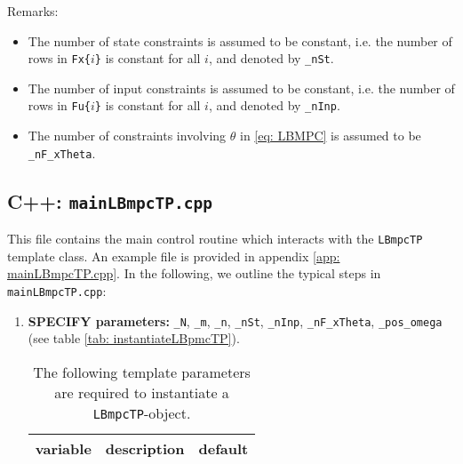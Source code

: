 \documentclass[letter]{article}
\begin{document}
\begin{sffamily}
\begin{table}[!htdp]
\begin{center}
\begin{tabular}{|l|l|l|}
\end{tabular}
\end{center}
\label{tab: parameters Init.m}
\end{table}

\noindent
Remarks:
\begin{itemize}
	\item The number of state constraints is assumed to be constant, i.e. the number of rows in \texttt{Fx\{$i$\}} is constant for all $i$, and  denoted by \texttt{\_nSt}.
	\item The number of input constraints is assumed to be constant, i.e. the number of rows in \texttt{Fu\{$i$\}} is constant for all $i$, and denoted by \texttt{\_nInp}.
	\item The number of constraints involving $\theta$ in \eqref{eq: LBMPC} is assumed to be \texttt{\_nF\_xTheta}.
\end{itemize}


\subsection{C++: \texttt{mainLBmpcTP.cpp}}
This file contains the main control routine which interacts with the \texttt{LBmpcTP} template class. An example file is provided in appendix \ref{app: mainLBmpcTP.cpp}. In the following, we outline the typical steps in \texttt{mainLBmpcTP.cpp}:

\begin{enumerate}
	\item \textbf{SPECIFY parameters:} \texttt{\_N}, \texttt{\_m}, \texttt{\_n}, \texttt{\_nSt}, \texttt{\_nInp}, \texttt{\_nF\_xTheta}, \texttt{\_pos\_omega} (see table \ref{tab: instantiateLBpmcTP}).
	
		\begin{table}[!htdp]
		\caption{The following template parameters are required to instantiate a \texttt{LBmpcTP}-object.}
		\begin{center}
		\begin{tabular}{|l|l|l|}\hline
		{
 			\bf variable} & description & default \\ \hline\hline
 

\end{tabular}
\end{center}
\end{table}
\end{enumerate}
\end{sffamily}
\end{document}
